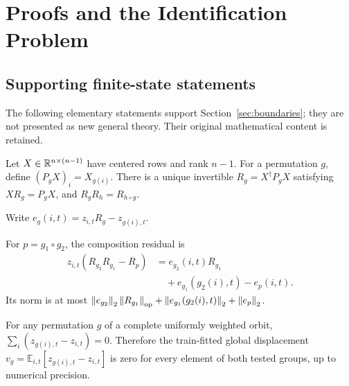 \section{Proofs and the Identification Problem}
\label{app:theory}
\label{sec:appendix}
\subsection{Supporting finite-state statements}
The following elementary statements support Section~\ref{sec:boundaries}; they are not presented as new general theory. Their original mathematical content is retained.

\begin{proposition}
\label{prop:finite}
Let $X\in\mathbb{R}^{n\times(n-1)}$ have centered rows and rank $n-1$. For a permutation $g$, define $(P_gX)_i=X_{g(i)}$. There is a unique invertible $R_g=X^\dagger P_gX$ satisfying $XR_g=P_gX$, and $R_gR_h=R_{h\circ g}$.
\end{proposition}

Write $e_g(i,t)=z_{i,t}R_g-z_{g(i),t}$.
\begin{proposition}
\label{prop:propagation}
For $p=g_1\circ g_2$, the composition residual is
\begin{align}
 z_{i,t}(R_{g_2}R_{g_1}-R_p)
 &=e_{g_2}(i,t)R_{g_1} \nonumber\\
 &\quad+e_{g_1}(g_2(i),t)-e_p(i,t).
\end{align}
Its norm is at most $\left\lVert e_{g_2}\right\rVert_2\left\lVert R_{g_1}\right\rVert_{\rm op}+\left\lVert e_{g_1}(g_2(i),t)\right\rVert_2+\left\lVert e_p\right\rVert_2$.
\end{proposition}

\begin{proposition}
\label{prop:additive}
For any permutation $g$ of a complete uniformly weighted orbit, $\sum_i(z_{g(i),t}-z_{i,t})=0$. Therefore the train-fitted global displacement $v_g=\mathbb{E}_{i,t}[z_{g(i),t}-z_{i,t}]$ is zero for every element of both tested groups, up to numerical precision.
\end{proposition}

